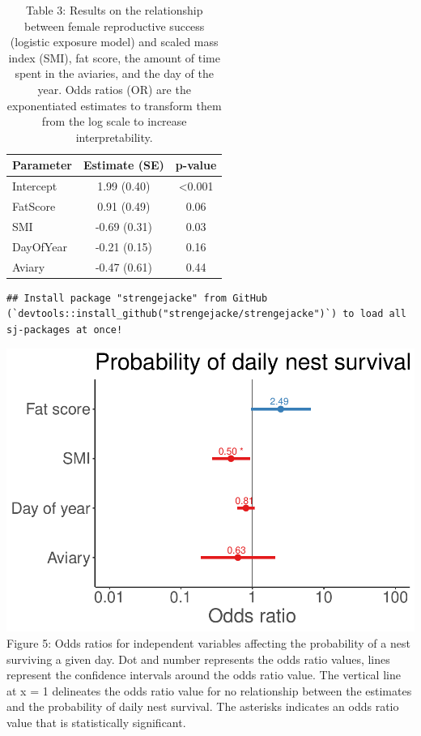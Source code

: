 \documentclass[
]{article}
\begin{document}
\begin{table}

\caption{\label{tab:logexp}Table 3: Results on the relationship between female reproductive success (logistic exposure model) and scaled mass index (SMI), fat score, the amount of time spent in the aviaries, and the day of the year. Odds ratios (OR) are the exponentiated estimates to transform them from the log scale to increase interpretability.}
\centering
\begin{tabular}[t]{l|c|c}
\hline
Parameter & Estimate (SE) & p-value\\
\hline
Intercept & 1.99 (0.40) & <0.001\\
\hline
FatScore & 0.91 (0.49) & 0.06\\
\hline
SMI & -0.69 (0.31) & 0.03\\
\hline
DayOfYear & -0.21 (0.15) & 0.16\\
\hline
Aviary & -0.47 (0.61) & 0.44\\
\hline
\end{tabular}
\end{table}

\begin{verbatim}
## Install package "strengejacke" from GitHub (`devtools::install_github("strengejacke/strengejacke")`) to load all sj-packages at once!
\end{verbatim}

\includegraphics{gcondition_files/figure-latex/logexp-1.pdf} Figure 5:
Odds ratios for independent variables affecting the probability of a
nest surviving a given day. Dot and number represents the odds ratio
values, lines represent the confidence intervals around the odds ratio
value. The vertical line at x = 1 delineates the odds ratio value for no
relationship between the estimates and the probability of daily nest
survival. The asterisks indicates an odds ratio value that is
statistically significant.
\end{document}
